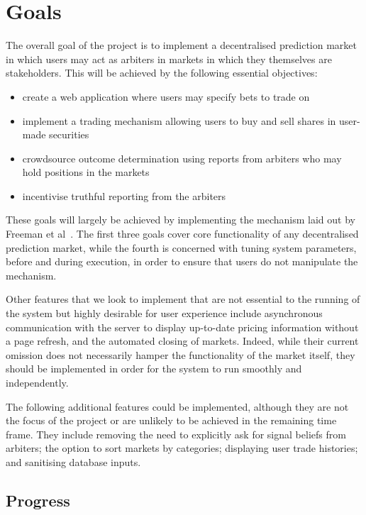 \documentclass[10pt,a4paper]{article}
\theoremstyle{plain}
\theoremstyle{definition}
\begin{document}
\section{Goals}

\label{sec:goals}

The overall goal of the project is to implement a decentralised prediction
market in which users may act as arbiters in markets in which they themselves
are stakeholders. This will be achieved by the following essential objectives:

\begin{itemize}
	\itemsep0em
	\item create a web application where users may specify bets to trade on
	\item implement a trading mechanism allowing users to buy and sell
		shares in user-made securities
	\item crowdsource outcome determination using reports from arbiters who may
		hold positions in the markets
	\item incentivise truthful reporting from the arbiters
\end{itemize}

These goals will largely be achieved by implementing the mechanism laid out by
Freeman et al~\cite{CODiPM}. The first three goals cover core functionality of
any decentralised prediction market, while the fourth is concerned with tuning
system parameters, before and during execution, in order to ensure that users
do not manipulate the mechanism.
 
Other features that we look to implement that are not essential to the running
of the system but highly desirable for user experience include asynchronous
communication with the server to display up-to-date pricing information without
a page refresh, and the automated closing of markets.  Indeed, while their
current omission does not necessarily hamper the functionality of the market
itself, they should be implemented in order for the system to run smoothly and
independently.

The following additional features could be implemented, although they are not
the focus of the project or are unlikely to be achieved in the remaining time
frame. They include removing the need to explicitly ask for signal beliefs
from arbiters; the option to sort markets by categories; displaying user trade
histories; and sanitising database inputs.

\subsection{Progress} 
\end{document}
